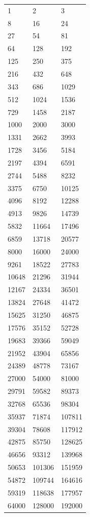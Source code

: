 \documentclass[a4paper,11pt,oneside]{book}
\begin{document}
\begin{center}
\begin{longtable}{l|l|l}
		1 & 2 & 3 \\
		8 & 16 & 24 \\
		27 & 54 & 81 \\
		64 & 128 & 192 \\
		125 & 250 & 375 \\
		216 & 432 & 648 \\
		343 & 686 & 1029 \\
		512 & 1024 & 1536 \\
		729 & 1458 & 2187 \\
		1000 & 2000 & 3000 \\
		1331 & 2662 & 3993 \\
		1728 & 3456 & 5184 \\
		2197 & 4394 & 6591 \\
		2744 & 5488 & 8232 \\
		3375 & 6750 & 10125 \\
		4096 & 8192 & 12288 \\
		4913 & 9826 & 14739 \\
		5832 & 11664 & 17496 \\
		6859 & 13718 & 20577 \\
		8000 & 16000 & 24000 \\
		9261 & 18522 & 27783 \\
		10648 & 21296 & 31944 \\
		12167 & 24334 & 36501 \\
		13824 & 27648 & 41472 \\
		15625 & 31250 & 46875 \\
		17576 & 35152 & 52728 \\
		19683 & 39366 & 59049 \\
		21952 & 43904 & 65856 \\
		24389 & 48778 & 73167 \\
		27000 & 54000 & 81000 \\
		29791 & 59582 & 89373 \\
		32768 & 65536 & 98304 \\
		35937 & 71874 & 107811 \\
		39304 & 78608 & 117912 \\
		42875 & 85750 & 128625 \\
		46656 & 93312 & 139968 \\
		50653 & 101306 & 151959 \\
		54872 & 109744 & 164616 \\
		59319 & 118638 & 177957 \\
		64000 & 128000 & 192000 \\

\end{longtable}
\end{center}
\end{document}
